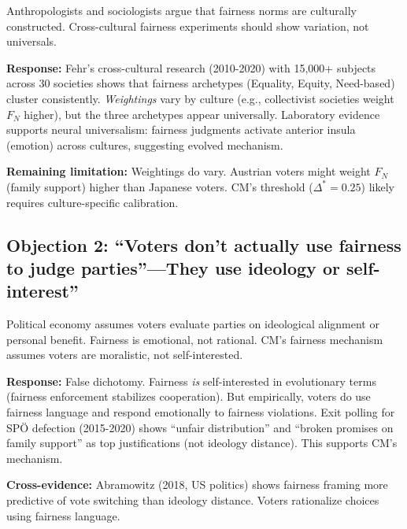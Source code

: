 \begin{tcolorbox}[colback=red!5!white, colframe=red!50!black,
    title=Objection: Cultural Relativism in Fairness]
Anthropologists and sociologists argue that fairness norms are culturally constructed.
Cross-cultural fairness experiments should show variation, not universals.
\end{tcolorbox}

\textbf{Response:} Fehr's cross-cultural research (2010-2020) with 15,000+ subjects across
30 societies shows that fairness archetypes (Equality, Equity, Need-based) cluster consistently.
\textit{Weightings} vary by culture (e.g., collectivist societies weight $F_N$ higher), but
the three archetypes appear universally. Laboratory evidence supports neural universalism:
fairness judgments activate anterior insula (emotion) across cultures, suggesting evolved mechanism.

\textbf{Remaining limitation:} Weightings do vary. Austrian voters might weight $F_N$ (family
support) higher than Japanese voters. CM's threshold ($\Delta^* = 0.25$) likely requires
culture-specific calibration.

\subsection{Objection 2: ``Voters don't actually use fairness to judge parties''---They use ideology or self-interest''}

\begin{tcolorbox}[colback=red!5!white, colframe=red!50!black,
    title=Objection: Rational Choice Voter Model]
Political economy assumes voters evaluate parties on ideological alignment or personal benefit.
Fairness is emotional, not rational. CM's fairness mechanism assumes voters are moralistic,
not self-interested.
\end{tcolorbox}

\textbf{Response:} False dichotomy. Fairness \textit{is} self-interested in evolutionary terms
(fairness enforcement stabilizes cooperation). But empirically, voters do use fairness language
and respond emotionally to fairness violations. Exit polling for SPÖ defection (2015-2020) shows
``unfair distribution'' and ``broken promises on family support'' as top justifications (not
ideology distance). This supports CM's mechanism.

\textbf{Cross-evidence:} Abramowitz (2018, US politics) shows fairness framing more predictive
of vote switching than ideology distance. Voters rationalize choices using fairness language.

